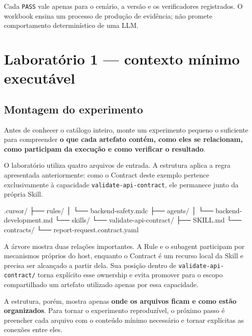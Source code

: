 \documentclass[
  10pt,
  a4paper,
  oneside]{book}
\newenvironment{Shaded}{}{}
\newcommand{\NormalTok}[1]{#1}
\renewenvironment{Shaded}{\begin{snugshade}}{\end{snugshade}}%
\begin{document}
Cada \texttt{PASS} vale apenas para o cenário, a versão e os
verificadores registrados. O workbook ensina um processo de produção de
evidência; não promete comportamento determinístico de uma LLM.

\hypertarget{laboratuxf3rio-1-contexto-muxednimo-executuxe1vel}{%
\chapter{Laboratório 1 --- contexto mínimo
executável}\label{laboratuxf3rio-1-contexto-muxednimo-executuxe1vel}}

\hypertarget{montagem-do-experimento}{%
\section{Montagem do experimento}\label{montagem-do-experimento}}

Antes de conhecer o catálogo inteiro, monte um experimento pequeno o
suficiente para compreender \textbf{o que cada artefato contém, como
eles se relacionam, como participam da execução e como verificar o
resultado}.

O laboratório utiliza quatro arquivos de entrada. A estrutura aplica a
regra apresentada anteriormente: como o Contract deste exemplo pertence
exclusivamente à capacidade \texttt{validate-api-contract}, ele
permanece junto da própria Skill.

\begin{Shaded}
\begin{Highlighting}[]
\NormalTok{.cursor/}
\NormalTok{├── rules/}
\NormalTok{│   └── backend{-}safety.mdc}
\NormalTok{├── agents/}
\NormalTok{│   └── backend{-}development.md}
\NormalTok{└── skills/}
\NormalTok{    └── validate{-}api{-}contract/}
\NormalTok{        ├── SKILL.md}
\NormalTok{        └── contracts/}
\NormalTok{            └── report{-}request.contract.yaml}
\end{Highlighting}
\end{Shaded}

A árvore mostra duas relações importantes. A Rule e o subagent
participam por mecanismos próprios do host, enquanto o Contract é um
recurso local da Skill e precisa ser alcançado a partir dela. Sua
posição dentro de \texttt{validate-api-contract/} torna explícito esse
ownership e evita promover para o escopo compartilhado um artefato
utilizado apenas por essa capacidade.

A estrutura, porém, mostra apenas \textbf{onde os arquivos ficam e como
estão organizados}. Para tornar o experimento reproduzível, o próximo
passo é preencher cada arquivo com o conteúdo mínimo necessário e tornar
explícitas as conexões entre eles.
\end{document}

